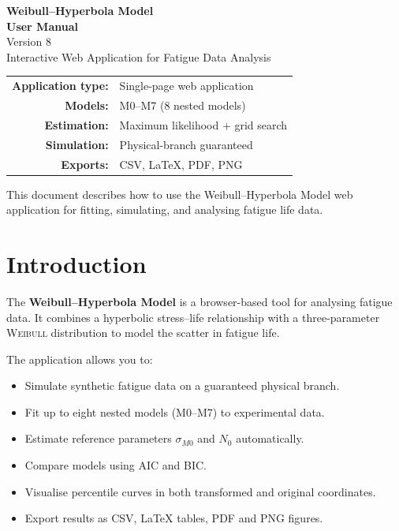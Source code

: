 \documentclass[11pt,a4paper]{article}
\newcommand{\sMzero}{\ensuremath{\sigma_{M0}}}
\newcommand{\Nzero}{\ensuremath{N_0}}
\newcommand{\Weibull}{\textsc{Weibull}}
\begin{document}
\begin{titlepage}
\centering
\vspace*{3cm}

{\Huge\bfseries\color{accent} Weibull--Hyperbola Model}\\[0.4cm]
{\LARGE\bfseries User Manual}\\[1.5cm]

{\large Version 8}\\[0.3cm]
{\large Interactive Web Application for Fatigue Data Analysis}\\[3cm]

\begin{tabular}{rl}
\textbf{Application type:} & Single-page web application \\
\textbf{Models:} & M0--M7 (8 nested models) \\
\textbf{Estimation:} & Maximum likelihood + grid search \\
\textbf{Simulation:} & Physical-branch guaranteed \\
\textbf{Exports:} & CSV, LaTeX, PDF, PNG \\
\end{tabular}

\vfill

{\small This document describes how to use the Weibull--Hyperbola Model web application for fitting, simulating, and analysing fatigue life data.}

\end{titlepage}

\tableofcontents
\newpage

\section{Introduction}

The \textbf{Weibull--Hyperbola Model} is a browser-based tool for analysing fatigue data. It combines a hyperbolic stress--life relationship with a three-parameter \Weibull{} distribution to model the scatter in fatigue life.

The application allows you to:
\begin{itemize}[leftmargin=1.4em]
  \item Simulate synthetic fatigue data on a guaranteed physical branch.
  \item Fit up to eight nested models (M0--M7) to experimental data.
  \item Estimate reference parameters $\sMzero$ and $\Nzero$ automatically.
  \item Compare models using AIC and BIC.
  \item Visualise percentile curves in both transformed and original coordinates.
  \item Export results as CSV, LaTeX tables, PDF and PNG figures.
\end{itemize}
\end{document}
